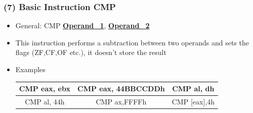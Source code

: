 \documentclass[]{beamer}
\begin{document}
		\begin{frame}
			\frametitle{(7) Basic Instruction CMP}
			\begin{itemize}
				\item{General: CMP \underline{\textbf{Operand\_1}}, \underline{\textbf{Operand\_2}}}\\

				\item{This instruction performs a subtraction between two operands and sets  the flags (ZF,CF,OF etc.), it doesn't store the result}
				\item{Examples}
					\begin{table}[h]
						\begin{tabular}{|c|c|c|}
							\hline
							CMP eax, ebx&CMP eax, 44BBCCDDh&CMP al, dh\\
							\hline
							CMP al, 44h&CMP ax,FFFFh&CMP [eax],4h\\
							\hline
						\end{tabular}
					\end{table}
			\end{itemize}
		\end{frame}
\end{document}
